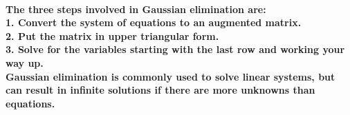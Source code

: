 \documentclass{article}
\begin{document}
\paragraph{The three steps involved in Gaussian elimination are:\\
1. Convert the system of equations to an augmented matrix.\\
2. Put the matrix in upper triangular form.\\
3. Solve for the variables starting with the last row and working your way up.\\
Gaussian elimination is commonly used to solve linear systems, but can result in infinite solutions if there are more unknowns than equations.}
\end{document}

